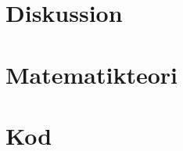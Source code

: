 \documentclass[a4paper]{report}
\begin{document}
\newpage
\chapter{Diskussion}
\label{sec:diskussion}







\newpage
\printbibliography

\appendix
\newpage
\chapter{Matematikteori}

\chapter{Kod}


\end{document}
